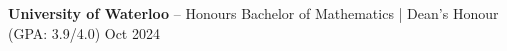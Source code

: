 \textbf{University of Waterloo} -- Honours Bachelor of Mathematics | Dean's Honour (GPA: 3.9/4.0) \hfill Oct 2024 \\
